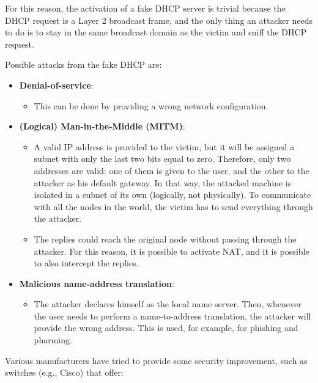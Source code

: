 For this reason, the activation of a fake DHCP server is trivial because the DHCP request is a Layer 2 broadcast frame, and the only thing an attacker needs to do is to stay in the same broadcast domain as the victim and sniff the DHCP request.


Possible attacks from the fake DHCP are:

\begin{itemize}
    \item \textbf{Denial-of-service}:
          \begin{itemize}
              \item This can be done by providing a wrong network configuration.
          \end{itemize}

    \item \textbf{(Logical) Man-in-the-Middle (MITM)}:
          \begin{itemize}
              \item A valid IP address is provided to the victim, but it will be assigned a subnet with only the last two bits equal to zero. Therefore, only two addresses are valid: one of them is given to the user, and the other to the attacker as his default gateway. In that way, the attacked machine is isolated in a subnet of its own (logically, not physically). To communicate with all the nodes in the world, the victim has to send everything through the attacker.
              \item The replies could reach the original node without passing through the attacker. For this reason, it is possible to activate NAT, and it is possible to also intercept the replies.
          \end{itemize}

    \item \textbf{Malicious name-address translation}:
          \begin{itemize}
              \item The attacker declares himself as the local name server. Then, whenever the user needs to perform a name-to-address translation, the attacker will provide the wrong address. This is used, for example, for phishing and pharming.
          \end{itemize}
\end{itemize}

Various manufacturers have tried to provide some security improvement, such as switches (e.g., Cisco) that offer:

